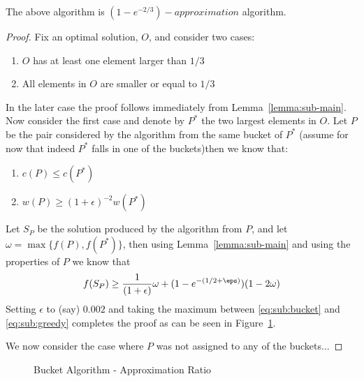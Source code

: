 \begin{theorem}
	The above algorithm is $(1 - e^{-2/3})-approximation$ algorithm.
\end{theorem}

\begin{proof}
	Fix an optimal solution, $O$, and consider two cases:
	\begin{enumerate}
		\item $O$ has at least one element larger than $1/3$
		\item All elements in $O$ are smaller or equal to $1/3$
	\end{enumerate}
	In the later case the proof follows immediately from Lemma~\ref{lemma:sub-main}.
	Now consider the first case and denote by $P^*$ the two largest elements in $O$.
	Let $P$ be the pair considered by the algorithm from the same bucket of $P^*$ (assume for now that indeed $P^*$ falls in one of the buckets)then we know
	that:
	\begin{enumerate}
		\item $c(P) \leq c(P^*)$
		\item $w(P) \geq (1 + \epsilon)^{-2}w(P^*)$
	\end{enumerate}
	Let $S_P$ be the solution produced by the algorithm from $P$, and let $\omega = \max\{f(P), f(P^*)\}$,
	then using Lemma~\ref{lemma:sub-main} and using the properties of $P$ we know that
	\begin{equation}
		\label{eq:sub:bucket}
		f(S_P) \geq \frac{1}{(1 + \epsilon)}\omega + (1-e^{-(1/2 + \eps)})(1 - 2\omega)
	\end{equation}
	Setting $\epsilon$ to (say) $0.002$ and taking the maximum between \ref{eq:sub:bucket} and
	\ref{eq:sub:greedy} completes the proof as can be seen in Figure~\ref{fig:sub:bucket}.

	We now consider the case where $P$ was not assigned to any of the buckets...
\end{proof}

\begin{figure}
	\def\zeta{0.002}
	\caption{
		\label{fig:sub:bucket}
		Bucket Algorithm - Approximation Ratio
	}
\end{figure}
